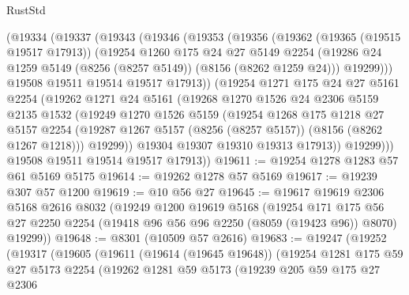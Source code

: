 \begin{lexlean}{RustStd}
\begin{coremodule}
      (@19334
        (@19337
          (@19343
            (@19346
              (@19353
                (@19356
                  (@19362
                    (@19365 (@19515 @19517 @17913))
                    (@19254
                      @1260
                      @175
                      @24
                      @27
                      @5149
                      @2254
                      (@19286 @24 @1259 @5149 (@8256 (@8257 @5149)) (@8156 (@8262 @1259 @24)))
                      @19299)))
                @19508
                @19511
                @19514
                @19517
                @17913))
            (@19254
              @1271
              @175
              @24
              @27
              @5161
              @2254
              (@19262
                @1271
                @24
                @5161
                (@19268
                  @1270
                  @1526
                  @24
                  @2306
                  @5159
                  @2135
                  @1532
                  (@19249
                    @1270
                    @1526
                    @5159
                    (@19254
                      @1268
                      @175
                      @1218
                      @27
                      @5157
                      @2254
                      (@19287 @1267 @5157 (@8256 (@8257 @5157)) (@8156 (@8262 @1267 @1218)))
                      @19299))
                  @19304
                  @19307
                  @19310
                  @19313
                  @17913))
              @19299)))
        @19508
        @19511
        @19514
        @19517
        @17913))
@19611 := @19254 @1278 @1283 @57 @61 @5169 @5175
@19614 := @19262 @1278 @57 @5169
@19617 := @19239 @307 @57 @1200
@19619 := @10 @56 @27
@19645 := @19617
    @19619
    @2306
    @5168
    @2616
    @8032
    (@19249
      @1200
      @19619
      @5168
      (@19254
        @171
        @175
        @56
        @27
        @2250
        @2254
        (@19418 @96 @56 @96 @2250 (@8059 (@19423 @96)) @8070)
        @19299))
@19648 := @8301 (@10509 @57 @2616)
@19683 := @19247
    (@19252
      (@19317
        (@19605
          (@19611
            (@19614 (@19645 @19648))
            (@19254
              @1281
              @175
              @59
              @27
              @5173
              @2254
              (@19262
                @1281
                @59
                @5173
                (@19239
                  @205
                  @59
                  @175
                  @27
                  @2306

\end{coremodule}
\end{lexlean}
